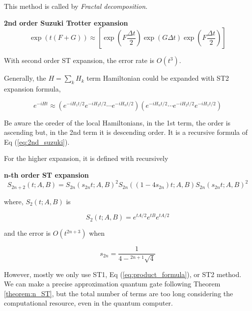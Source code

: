 This method is called by \textit{Fractal decomposition}\cite{suzuki_finding_2005}.


\begin{theorem}\textbf{2nd order Suzuki Trotter expansion}
    \begin{equation}
        \label{eq:2nd_suzuki}
        \exp\left(t (F + G)\right) \approx [\exp(F \frac{\Delta t}{2}) \exp(G\Delta t) \exp(F \frac{\Delta t}{2})]
    \end{equation}
\end{theorem}

With second order ST expansion, the error rate is $O(t^3)$.

Generally, the $H = \sum_k H_k$ term Hamiltonian could be expanded with ST2 expansion formula,

\begin{equation}
    e^{-i H t} \approx \left( e^{-i H_1 t/2} e^{-i H_2 t/2} \cdots e^{-i H_n t/2} \right)\left(e^{-i H_n t/2} \cdots e^{-i H_2 t/2} e^{-i H_1 t/2} \right)
\end{equation}

Be aware the oreder of the local Hamiltonians, in the 1st term, the order is ascending but, in the 2nd term
it is descending order. It is a recursive formula of Eq (\ref{eq:2nd_suzuki}).

For the higher expansion, it is defined with recursively

\begin{theorem} \textbf{n-th order ST expansion}
    \label{theorem:n_ST}
    \begin{equation}
        S_{2n+2}(t; A, B) = S_{2n}(s_{2n} t; A, B)^2 S_{2n}((1-4s_{2n}) t; A, B) S_{2n}(s_{2n} t; A, B)^2 
    \end{equation}

    where, $S_2(t; A, B)$ is 

    \begin{equation}
        S_2(t; A, B) = e^{t A/2} e^{t B} e^{t A/2}
    \end{equation}

    and the error is $O(t^{2n+3})$ when 

    \begin{equation}
        s_{2n} = \frac{1}{4 - {}^{2n+1}\sqrt{4}}
    \end{equation}
\end{theorem}

However, mostly we only use ST1, Eq (\ref{eq:product_formula}), or ST2 method.
We can make a precise approximation quantum gate following Theorem \ref{theorem:n_ST},
but the total number of terms are too long considering the computational resource, 
even in the quantum computer.

